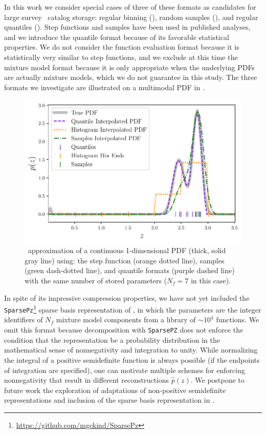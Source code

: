 In this work we consider special cases of three of these formats as candidates 
for large survey \pz\ catalog storage: regular binning 
(), random samples (), and 
regular quantiles ().
Step functions and samples have been used in published analyses, and we 
introduce the quantile format because of its favorable statistical properties.
We do not consider the function evaluation format because it is statistically 
very similar to step functions, and we exclude at this time the mixture model 
format because it is only appropriate when the underlying PDFs are actually 
mixture models, which we do not guarantee in this study.
The three formats we investigate are illustrated on a multimodal PDF in 
.
\begin{figure}
	\begin{center}
		\includegraphics[width=0.75\columnwidth]{figures/qp/demo_pz.pdf}
		\caption{\qp\ approximation of a continuous 1-dimensional PDF (thick, solid 
			gray line) using: the step function (orange dotted line), samples (green 
			dash-dotted line), and quantile formats (purple dashed line) with the same 
			number of stored parameters ($N_{f}=7$ in this case).
			}
	\end{center}
\end{figure}

In spite of its impressive compression properties, we have not yet included the 
\texttt{SparsePz}\footnote{\url{https://github.com/mgckind/SparsePz}} sparse 
basis representation of \citet{carrasco_kind_sparse_2014}, in which the 
parameters are the integer identifiers of $N_{f}$ mixture model components from 
a library of $\sim10^{4}$ functions.
We omit this format because decomposition with \texttt{SparsePZ} does not 
enforce the condition that the representation be a probability distribution in 
the mathematical sense of nonnegativity and integration to unity.
While normalizing the integral of a positive semidefinite function is always 
possible (if the endpoints of integration are specified), one can motivate 
multiple schemes for enforcing nonnegativity that result in different 
reconstructions $\hat{p}(z)$.
We postpone to future work the exploration of adaptations of non-positive 
semidefinite representations and inclusion of the sparse basis representation 
in \qp.

